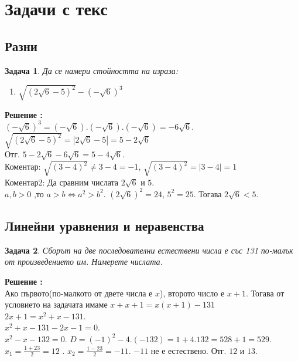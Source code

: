 \documentclass{article}
\newtheorem{problem}{Задача}
\newcounter{solution}
\newcommand\solution{%
	\stepcounter{solution}%
	\textbf{Решение :}\\%
}
\begin{document}
\section{Задачи с текс}

\subsection{Разни}
\begin{problem}
Да се намери стойността на израза:
\begin{enumerate}
	\item $\sqrt{(2\sqrt{6} - 5 )^2} - (-\sqrt{6})^3$
\end{enumerate}	
\end{problem}
\solution

$ (-\sqrt{6})^3 =(-\sqrt{6}).(-\sqrt{6}).(-\sqrt{6}) = -6\sqrt{6}. $ \\
$\sqrt{(2\sqrt{6} - 5 )^2} = | 2\sqrt{6} - 5 | = 5 - 2\sqrt6$ \\
Отг. $ 5 - 2\sqrt 6 - 6\sqrt{6} = 5 - 4\sqrt{6} $. \\
Коментар: $\sqrt{(3-4)^2} \neq 3-4 = -1 $, $\sqrt{(3-4)^2} = | 3-4| = 1$  \\
Коментар2: Да сравним числата $2\sqrt6$ и $5.$ \\
$a,b >0 $ ,то $a>b \iff a^2 > b^2 $. 
$(2\sqrt 6)^2 = 24$, $5^2 = 25 $. Тогава  $2\sqrt6 < 5.$

\subsection{Линейни уравнения и неравенства}

\begin{problem}
	Сборът на две последователни естествени числа е със 131 по-малък от произведението им. Намерете числата.	
\end{problem}
\solution
 Ако първото(по-малкото от двете числа е $x$), второто число е $x+1$. Тогава от условието на задачата имаме 
 $ x + x+1 = x(x+1) - 131 $ \\ $2x + 1 = x^2 + x - 131.$ \\
 $x^2 + x - 131  -2x -1 = 0.$ \\
 $ x^2 -x -132 = 0.$
$D = (-1)^2 - 4.(-132) = 1 + 4.132 = 528+1 =529.$
$x_1 = \frac{1 +23}{2} = 12 $ . $x_2 = \frac{1 - 23}{2} = -11$. $-11$ не е естествено.
Отг. $12$ и $13$.
\end{document}
